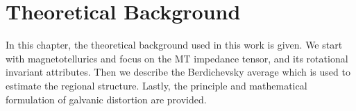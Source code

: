 
\renewcommand{\thisdir}{_content/theoretical_background}
\renewcommand{\figdir}{\thisdir/_fig}

\chapter{Theoretical Background}
\label{chap:background}

In this chapter, the theoretical background used in this work is given.
We start with magnetotellurics and focus on the MT impedance tensor, and its rotational invariant attributes. Then we describe the Berdichevsky average which is used to estimate the regional structure. Lastly, the principle and mathematical formulation of galvanic distortion are provided.




	

	
